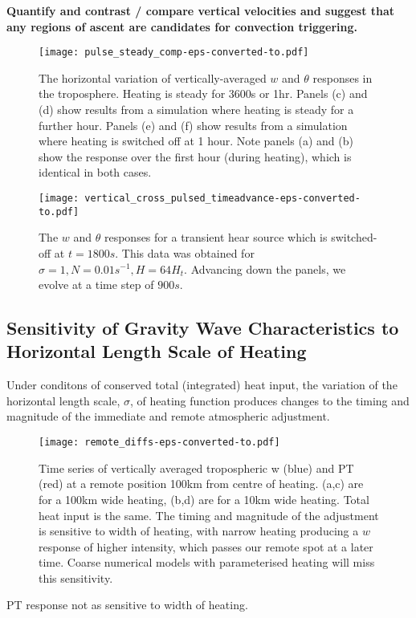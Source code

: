 \documentclass[a4paper,10pt]{article}
\begin{document}
{ \bf Quantify and contrast / compare vertical velocities and suggest that any regions of ascent are candidates for convection triggering. }  
%
\FloatBarrier
\begin{figure}[h!]
  \centering
    \texttt{[image: pulse\_steady\_comp-eps-converted-to.pdf]}
  \label{pulse_steady_comp}
  \caption{The horizontal variation of vertically-averaged $w$ and $\theta$ responses in the troposphere. Heating is steady for 3600s or 1hr.  Panels (c) and (d) show results from a simulation where heating is steady for a further hour. Panels (e) and (f) show results from a simulation where heating is switched off at 1 hour. Note panels (a) and (b) show the response over the first hour (during heating), which is identical in both cases. }
\end{figure}
\FloatBarrier
%
%
%
\begin{figure}[h!]
  \centering
    \texttt{[image: vertical\_cross\_pulsed\_timeadvance-eps-converted-to.pdf]}
  \label{vertical_cross_pulsed_timeadvance}
  \caption{The $w$ and $\theta$ responses for a transient hear source which is switched-off at $t = 1800s$. This data was obtained for $\sigma = 1, N = 0.01s^{-1}, H = 64H_t.$ Advancing down the panels, we evolve at a time step of $900s$. }
  \end{figure}
\FloatBarrier
%
%
%
\subsection{Sensitivity of Gravity Wave Characteristics to Horizontal Length Scale of Heating}
%
Under conditons of conserved total (integrated) heat input, the variation of the horizontal length scale, $\sigma$, of heating function produces changes to the timing and magnitude
of the immediate and remote atmospheric adjustment.     
%
\FloatBarrier
\begin{figure}[h!]
  \centering
    \texttt{[image: remote\_diffs-eps-converted-to.pdf]}
  \label{remote_diffs}
  \caption{ Time series of vertically averaged tropospheric w (blue) and PT (red) at a remote position 100km from centre of heating. (a,c) are for a 100km wide heating, (b,d) are for a 10km wide heating. Total heat input is the same. The timing and magnitude of the adjustment is sensitive to width of heating, with narrow heating producing a $w$ response of higher intensity, which passes our remote spot at a later time. Coarse numerical models with parameterised heating will miss this sensitivity.}
\end{figure}
\FloatBarrier
PT response not as sensitive to width of heating. 
\end{document}
